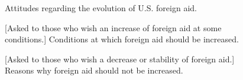 
\begin{figure}[h!]
    \caption{Attitudes regarding the evolution of U.S. foreign aid.}\label{fig:foreign_aid_raise_support}
\end{figure}

\begin{figure}[h!]
    \caption{[Asked to those who wish an increase of foreign aid at some conditions.] Conditions at which foreign aid should be increased.}\label{fig:foreign_aid_condition}
\end{figure}

\begin{figure}[h!]
    \caption{[Asked to those who wish a decrease or stability of foreign aid.] Reasons why foreign aid should not be increased.}\label{fig:foreign_aid_no}
\end{figure}

